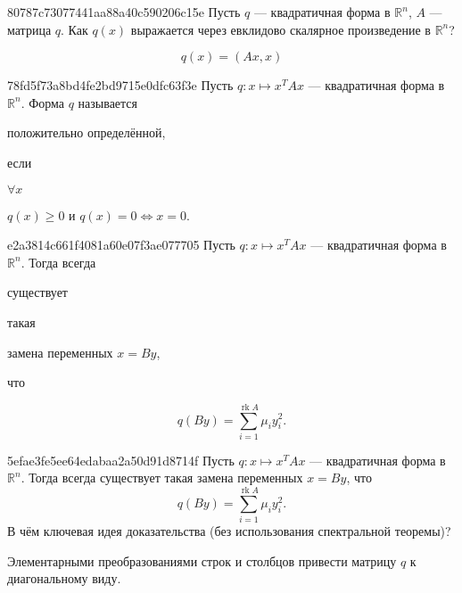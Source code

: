\begin{note}{80787c73077441aa88a40c590206c15e}
    Пусть \({ q }\) --- квадратичная форма в \({ \mathbb R^{n} }\), \({ A }\) --- матрица \({ q }\).
    Как \({ q(x) }\) выражается через евклидово скалярное произведение в \({ \mathbb R^{n} }\)?

    \begin{cloze}{1}
        \[
            q(x) = (Ax, x)
        \]
    \end{cloze}
\end{note}

\begin{note}{78fd5f73a8bd4fe2bd9715e0dfc63f3e}
    Пусть \({ q : x \mapsto x^{T}Ax }\) --- квадратичная форма в \({ \mathbb R^{n} }\).
    Форма \({ q }\) называется \begin{icloze}{2}положительно определённой,\end{icloze} если
    \begin{icloze}{1}
        \({ \forall x }\)
        \begin{center}
            \({ q(x) \geqslant 0 }\) \quad и \quad \({ q(x) = 0 \iff x = 0 }\).
        \end{center}
    \end{icloze}
\end{note}

\begin{note}{e2a3814c661f4081a60e07f3ae077705}
    Пусть \({ q : x \mapsto x^{T}Ax }\) --- квадратичная форма в \({ \mathbb R^{n} }\).
    Тогда всегда \begin{icloze}{3}существует\end{icloze} такая \begin{icloze}{2}замена переменных \({ x = By }\),\end{icloze} что
    \begin{icloze}{1}
        \[
            q(By) = \sum_{i=1}^{\operatorname{rk} A} \mu_i y_i^2.
        \]
    \end{icloze}
\end{note}

\begin{note}{5efae3fe5ee64edabaa2a50d91d8714f}
    Пусть \({ q : x \mapsto x^{T}Ax }\) --- квадратичная форма в \({ \mathbb R^{n} }\).
    Тогда всегда существует такая замена переменных \({ x = By }\), что
    \[
        q(By) = \sum_{i=1}^{\operatorname{rk} A} \mu_i y_i^2.
    \]
    В чём ключевая идея доказательства (без использования спектральной теоремы)?

    \begin{cloze}{1}
        Элементарными преобразованиями строк и столбцов привести матрицу \({ q }\) к диагональному виду.
    \end{cloze}
\end{note}

